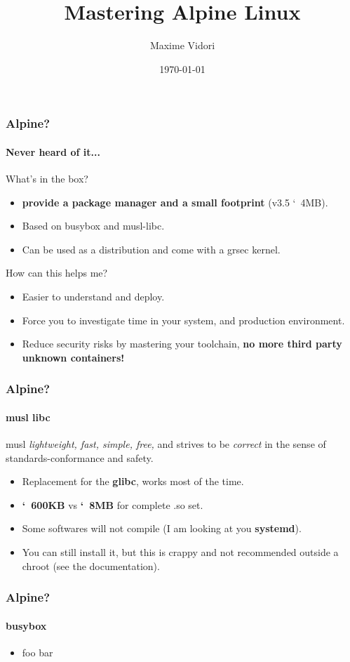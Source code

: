 \documentclass{beamer}
\title{Mastering Alpine Linux}
\date{\today}
\author{Maxime Vidori}
\begin{document}
\begin{frame}
  \titlepage
\end{frame}


\begin{frame}
  \frametitle{Alpine?}
  \framesubtitle{Never heard of it...}
  What's in the box?
  \begin{itemize}
    \item \textbf{provide a package manager and a small footprint} (v3.5 \char`~4MB).
    \item Based on busybox and musl-libc.
    \item Can be used as a distribution and come with a grsec kernel.
  \end{itemize}
  How can this helps me?
  \begin{itemize}
    \item Easier to understand and deploy.
    \item Force you to investigate time in your system, and production
      environment.
    \item Reduce security risks by mastering your toolchain,
      \textbf{no more third party unknown containers!}
  \end{itemize}
\end{frame}

\begin{frame}
  \frametitle{Alpine?}
  \framesubtitle{musl libc}
  \begin{block}{musl}
    \textit{lightweight, fast, simple, free,} and strives to be
    \textit{correct} in the sense of standards-conformance and safety.
    \end{block}
  \begin{itemize}
    \item Replacement for the \textbf{glibc}, works most of the time.
    \item \textbf{\char`~600KB} vs \textbf{\char`~8MB} for complete .so set.
    \item Some softwares will not compile (I am looking at you \textbf{systemd}).
  \item You can still install it, but this is crappy and not
      recommended outside a chroot (see the documentation).
  \end{itemize}
\end{frame}

\begin{frame}
  \frametitle{Alpine?}
  \framesubtitle{busybox}
  \begin{itemize}
    \item foo bar
  \end{itemize}
\end{frame}
\end{document}
